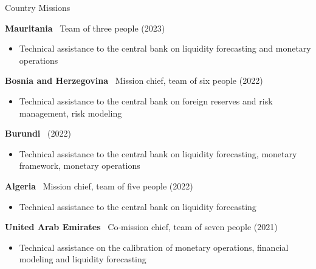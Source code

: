 \documentclass[usegeometry, 10pt, a4paper]{cv} %
\newcommand{\activite}[1]{\textbf{#1}\ }
\newcommand{\midreduce}{-0.5cm}
\begin{document}
  \begin{rubriquetableau}[0.95\textwidth]{Country Missions}
    \vspace{-0.5cm}

  \activite{Mauritania} Team of three people (2023)\\
  \vspace{\midreduce}
  \begin{itemize}[label={}]
  \item \small{Technical assistance to the central bank on liquidity forecasting and monetary operations}    
  \end{itemize}
    
  \activite{Bosnia and Herzegovina} Mission chief, team of six people (2022)\\
  \vspace{\midreduce}
  \begin{itemize}[label={}]
  \item \small{Technical assistance to the central bank on foreign reserves and risk management, risk modeling}    
  \end{itemize}

  \activite{Burundi} (2022)\\
  \vspace{\midreduce}
  \begin{itemize}[label={}]
  \item \small{Technical assistance to the central bank on liquidity forecasting, monetary framework, monetary operations}    
  \end{itemize}
  
  \activite{Algeria} Mission chief, team of five people (2022)\\
  \vspace{\midreduce}
  \begin{itemize}[label={}]
  \item \small{Technical assistance to the central bank on liquidity forecasting}    
  \end{itemize}
  
  \activite{United Arab Emirates} Co-mission chief, team of seven people (2021)\\
  \vspace{\midreduce}
  \begin{itemize}[label={}]
    \item \small{Technical assistance on the calibration of monetary
        operations, financial modeling and liquidity forecasting}
  \end{itemize}


\end{rubriquetableau}
\end{document}
